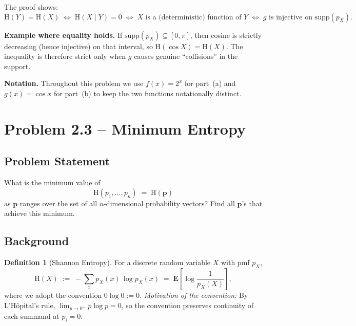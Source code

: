 \documentclass[12pt,a4paper]{article}
\theoremstyle{plain}
\theoremstyle{definition}
\newtheorem{definition}[theorem]{Definition}
\theoremstyle{remark}
\newcommand{\HH}{\mathrm{H}}
\newcommand{\EE}{\mathbf{E}}
\newcommand{\supp}{\mathrm{supp}}
\begin{document}
The proof shows:
\[
  \HH(Y) = \HH(X)
  \;\Longleftrightarrow\;
  \HH(X\mid Y) = 0
  \;\Longleftrightarrow\;
  X \text{ is a (deterministic) function of } Y
  \;\Longleftrightarrow\;
  g\text{ is injective on }\supp(p_X).
\]

\begin{notebox}
\textbf{Example where equality holds.}
If $\supp(p_X) \subseteq [0,\pi]$, then cosine is strictly decreasing (hence
injective) on that interval, so $\HH(\cos X)=\HH(X)$.  The inequality is
therefore strict only when $g$ causes genuine ``collisions'' in the support.
\end{notebox}

\begin{notebox}
\textbf{Notation.}
Throughout this problem we use $f(x)=2^x$ for part~(a) and $g(x)=\cos x$ for
part~(b) to keep the two functions notationally distinct.
\end{notebox}

\newpage
\section{Problem 2.3 – Minimum Entropy}

\subsection*{Problem Statement}

What is the minimum value of
\[
  \HH(p_1,\dots,p_n) \;=\; \HH(\mathbf{p})
\]
as $\mathbf{p}$ ranges over the set of all $n$-dimensional probability vectors?
Find all $\mathbf{p}$'s that achieve this minimum.

\subsection*{Background}

\begin{definition}[Shannon Entropy]
  For a discrete random variable $X$ with pmf $p_X$,
  \[
    \HH(X) \;:=\; -\sum_{x} p_X(x)\,\log p_X(x) \;=\; \EE\!\left[\log\frac{1}{p_X(X)}\right],
  \]
  where we adopt the convention $0\log 0 := 0$.
  \emph{Motivation of the convention:} By L'Hôpital's rule,
  $\lim_{p\to 0^+} p\log p = 0$,
  so the convention preserves continuity of each summand at $p_i=0$.
\end{definition}
\end{document}
